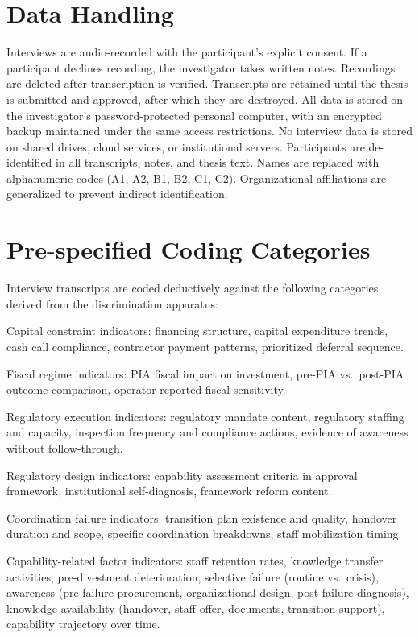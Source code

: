 \documentclass[twoside,fontset=lmodern]{mitthesis}
\begin{document}
\hypertarget{data-handling}{%
\section{Data Handling}\label{data-handling}}

Interviews are audio-recorded with the participant's explicit consent.
If a participant declines recording, the investigator takes written
notes. Recordings are deleted after transcription is verified.
Transcripts are retained until the thesis is submitted and approved,
after which they are destroyed. All data is stored on the investigator's
password-protected personal computer, with an encrypted backup
maintained under the same access restrictions. No interview data is
stored on shared drives, cloud services, or institutional servers.
Participants are de-identified in all transcripts, notes, and thesis
text. Names are replaced with alphanumeric codes (A1, A2, B1, B2, C1,
C2). Organizational affiliations are generalized to prevent indirect
identification.

\hypertarget{pre-specified-coding-categories}{%
\section{Pre-specified Coding
Categories}\label{pre-specified-coding-categories}}

Interview transcripts are coded deductively against the following
categories derived from the discrimination apparatus:

Capital constraint indicators: financing structure, capital expenditure
trends, cash call compliance, contractor payment patterns, prioritized
deferral sequence.

Fiscal regime indicators: PIA fiscal impact on investment, pre-PIA
vs.~post-PIA outcome comparison, operator-reported fiscal sensitivity.

Regulatory execution indicators: regulatory mandate content, regulatory
staffing and capacity, inspection frequency and compliance actions,
evidence of awareness without follow-through.

Regulatory design indicators: capability assessment criteria in approval
framework, institutional self-diagnosis, framework reform content.

Coordination failure indicators: transition plan existence and quality,
handover duration and scope, specific coordination breakdowns, staff
mobilization timing.

Capability-related factor indicators: staff retention rates, knowledge
transfer activities, pre-divestment deterioration, selective failure
(routine vs.~crisis), awareness (pre-failure procurement, organizational
design, post-failure diagnosis), knowledge availability (handover, staff
offer, documents, transition support), capability trajectory over time.
\end{document}
